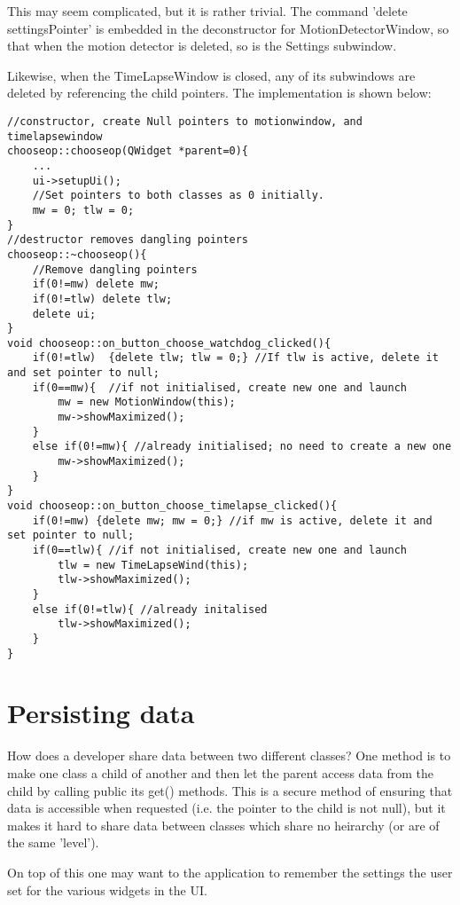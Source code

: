 This may seem complicated, but it is rather trivial. The command 'delete settingsPointer'  is embedded in the deconstructor for MotionDetectorWindow, so that when the motion detector is deleted, so is the Settings subwindow.

Likewise, when the TimeLapseWindow is closed, any of its subwindows are deleted by referencing the child pointers.
The implementation is shown below:\\
\begin{lstlisting}[title=Snippet from ChooseOp.cpp (MainWindow)]
//constructor, create Null pointers to motionwindow, and timelapsewindow
chooseop::chooseop(QWidget *parent=0){
    ...
    ui->setupUi();
    //Set pointers to both classes as 0 initially.
    mw = 0; tlw = 0;
}
//destructor removes dangling pointers
chooseop::~chooseop(){
    //Remove dangling pointers
    if(0!=mw) delete mw;
    if(0!=tlw) delete tlw;
    delete ui;
}
void chooseop::on_button_choose_watchdog_clicked(){
    if(0!=tlw)  {delete tlw; tlw = 0;} //If tlw is active, delete it and set pointer to null;
    if(0==mw){  //if not initialised, create new one and launch
        mw = new MotionWindow(this); 
        mw->showMaximized();
    }
    else if(0!=mw){ //already initialised; no need to create a new one
        mw->showMaximized();
    }
}
void chooseop::on_button_choose_timelapse_clicked(){
    if(0!=mw) {delete mw; mw = 0;} //if mw is active, delete it and set pointer to null;
    if(0==tlw){ //if not initialised, create new one and launch
        tlw = new TimeLapseWind(this);
        tlw->showMaximized();
    }
    else if(0!=tlw){ //already initalised
        tlw->showMaximized();
    }
}
\end{lstlisting}

\section{Persisting data}
How does a developer share data between two different classes? One method is to make one class a child of another and then let the parent access data from the child by calling public its get() methods. This is a secure method of ensuring that data is accessible when requested (i.e. the pointer to the child is not null), but it makes it hard to share data between classes which share no heirarchy (or are of the same 'level').

On top of this one may want to the application to remember the settings the user set for the various widgets in the UI.

